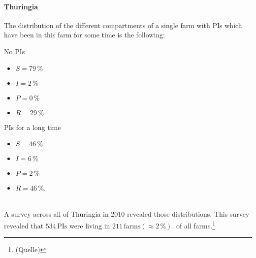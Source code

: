 \paragraph{Thuringia}
The distribution of the different compartments of a single farm with PIs which have been in this farm for some time is the following:
\\
\begin{minipage}[t]{0.5\linewidth}
No PIs
    \begin{itemize}
    \item $S= 79\,\%$
\item $I= 2\,\%$
\item $P= 0\,\%$ 
\item $R= 29\,\%$
    \end{itemize}
\end{minipage}
\begin{minipage}[t]{0.5\linewidth}
PIs for a long time
    \begin{itemize}
    \item $S= 46\,\%$
\item $I= 6\,\%$
\item $P= 2\,\%$ 
\item $R= 46\,\%$.
    \end{itemize}
\end{minipage}
\\
A survey across all of Thuringia in 2010 revealed those distributions. This survey revealed that $534\,\text{PIs}$ were living in $211\,\text{farms}(\approx 2\,\%)$. of all farms.\footnote{ (Quelle) }
